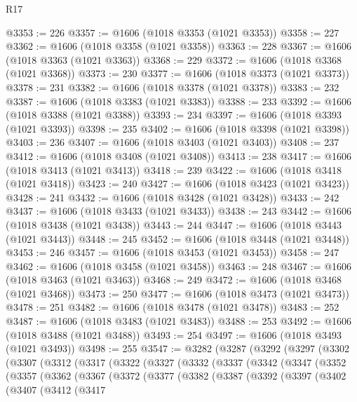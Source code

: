 \begin{lexlean}{R17}
\begin{coremodule}
{{{{{{{{{{{{{{{{{{{{{{{{{{{{{{{{{{{{{{{{{{{{{{{{{{{{{{{{{{{{{{{{{{{{{{{{{{{{{{{{{{{{{{{{{{{{{{{{{{{{{{{{{{{@3353 := 226
@3357 := @1606 (@1018 @3353 (@1021 @3353))
@3358 := 227
@3362 := @1606 (@1018 @3358 (@1021 @3358))
@3363 := 228
@3367 := @1606 (@1018 @3363 (@1021 @3363))
@3368 := 229
@3372 := @1606 (@1018 @3368 (@1021 @3368))
@3373 := 230
@3377 := @1606 (@1018 @3373 (@1021 @3373))
@3378 := 231
@3382 := @1606 (@1018 @3378 (@1021 @3378))
@3383 := 232
@3387 := @1606 (@1018 @3383 (@1021 @3383))
@3388 := 233
@3392 := @1606 (@1018 @3388 (@1021 @3388))
@3393 := 234
@3397 := @1606 (@1018 @3393 (@1021 @3393))
@3398 := 235
@3402 := @1606 (@1018 @3398 (@1021 @3398))
@3403 := 236
@3407 := @1606 (@1018 @3403 (@1021 @3403))
@3408 := 237
@3412 := @1606 (@1018 @3408 (@1021 @3408))
@3413 := 238
@3417 := @1606 (@1018 @3413 (@1021 @3413))
@3418 := 239
@3422 := @1606 (@1018 @3418 (@1021 @3418))
@3423 := 240
@3427 := @1606 (@1018 @3423 (@1021 @3423))
@3428 := 241
@3432 := @1606 (@1018 @3428 (@1021 @3428))
@3433 := 242
@3437 := @1606 (@1018 @3433 (@1021 @3433))
@3438 := 243
@3442 := @1606 (@1018 @3438 (@1021 @3438))
@3443 := 244
@3447 := @1606 (@1018 @3443 (@1021 @3443))
@3448 := 245
@3452 := @1606 (@1018 @3448 (@1021 @3448))
@3453 := 246
@3457 := @1606 (@1018 @3453 (@1021 @3453))
@3458 := 247
@3462 := @1606 (@1018 @3458 (@1021 @3458))
@3463 := 248
@3467 := @1606 (@1018 @3463 (@1021 @3463))
@3468 := 249
@3472 := @1606 (@1018 @3468 (@1021 @3468))
@3473 := 250
@3477 := @1606 (@1018 @3473 (@1021 @3473))
@3478 := 251
@3482 := @1606 (@1018 @3478 (@1021 @3478))
@3483 := 252
@3487 := @1606 (@1018 @3483 (@1021 @3483))
@3488 := 253
@3492 := @1606 (@1018 @3488 (@1021 @3488))
@3493 := 254
@3497 := @1606 (@1018 @3493 (@1021 @3493))
@3498 := 255
@3547 := @3282
    (@3287
      (@3292
        (@3297
          (@3302
            (@3307
              (@3312
                (@3317
                  (@3322
                    (@3327
                      (@3332
                        (@3337
                          (@3342
                            (@3347
                              (@3352
                                (@3357
                                  (@3362
                                    (@3367
                                      (@3372
                                        (@3377
                                          (@3382
                                            (@3387
                                              (@3392
                                                (@3397
                                                  (@3402
                                                    (@3407
                                                      (@3412
                                                        (@3417
}}}}}}}}}}}}}}}}}}}}}}}}}}}}}}}}}}}}}}}}}}}}}}}}}}}}}}}}}}}}}}}}}}}}}}}}}}}}}}}}}}}}}}}}}}}}}}}}}}}}}}}}}}}
\end{coremodule}
\end{lexlean}
